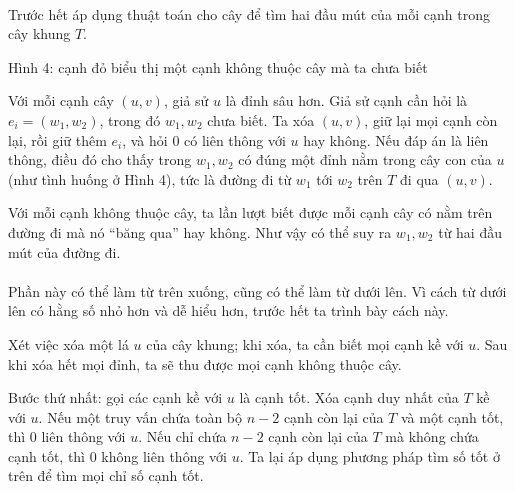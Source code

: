 \documentclass[11pt]{article}
\begin{document}
\paragraph{}
Trước hết áp dụng thuật toán cho cây để tìm hai đầu mút của mỗi cạnh trong cây
khung \(T\).

\begin{center}

Hình 4: cạnh đỏ biểu thị một cạnh không thuộc cây mà ta chưa biết
\end{center}

Với mỗi cạnh cây \((u,v)\), giả sử \(u\) là đỉnh sâu hơn. Giả sử cạnh cần hỏi
là \(e_i=(w_1,w_2)\), trong đó \(w_1,w_2\) chưa biết. Ta xóa \((u,v)\), giữ lại
mọi cạnh còn lại, rồi giữ thêm \(e_i\), và hỏi \(0\) có liên thông với \(u\) hay
không. Nếu đáp án là liên thông, điều đó cho thấy trong \(w_1,w_2\) có đúng một
đỉnh nằm trong cây con của \(u\) (như tình huống ở Hình 4), tức là đường đi từ
\(w_1\) tới \(w_2\) trên \(T\) đi qua \((u,v)\).

Với mỗi cạnh không thuộc cây, ta lần lượt biết được mỗi cạnh cây có nằm trên
đường đi mà nó ``băng qua'' hay không. Như vậy có thể suy ra \(w_1,w_2\) từ hai
đầu mút của đường đi.

\paragraph{}
Phần này có thể làm từ trên xuống, cũng có thể làm từ dưới lên. Vì cách từ dưới
lên có hằng số nhỏ hơn và dễ hiểu hơn, trước hết ta trình bày cách này.

Xét việc xóa một lá \(u\) của cây khung; khi xóa, ta cần biết mọi cạnh kề với
\(u\). Sau khi xóa hết mọi đỉnh, ta sẽ thu được mọi cạnh không thuộc cây.

Bước thứ nhất: gọi các cạnh kề với \(u\) là cạnh tốt. Xóa cạnh duy nhất của
\(T\) kề với \(u\). Nếu một truy vấn chứa toàn bộ \(n-2\) cạnh còn lại của
\(T\) và một cạnh tốt, thì \(0\) liên thông với \(u\). Nếu chỉ chứa \(n-2\) cạnh
còn lại của \(T\) mà không chứa cạnh tốt, thì \(0\) không liên thông với \(u\).
Ta lại áp dụng phương pháp tìm số tốt ở trên để tìm mọi chỉ số cạnh tốt.
\end{document}
